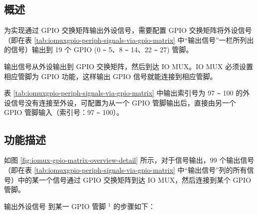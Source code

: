 \documentclass[main\_\_CN.tex]{subfiles}
\begin{document}
\subsection{概述}

为实现通过 GPIO 交换矩阵输出外设信号，需要配置 GPIO 交换矩阵将外设信号（即在表 \ref{tab:iomuxgpio-periph-signals-via-gpio-matrix} 中“输出信号”一栏所列出的信号）输出到 19 个 GPIO (0 \verb+~+ 5、8 \verb+~+ 14、22 \verb+~+ 27) 管脚。


输出信号从外设输出到 GPIO 交换矩阵，然后到达 IO MUX。IO MUX 必须设置相应管脚为 GPIO 功能，这样输出 GPIO 信号就能连接到相应管脚。

\begin{tiplisting}
表 \ref{tab:iomuxgpio-periph-signals-via-gpio-matrix} 中输出索引号为 97 \verb+~+ 100 的外设信号没有连接至外设，可配置为从一个 GPIO 管脚输出后，直接由另一个 GPIO 管脚输入（索引号：97 \verb+~+ 100）。
\end{tiplisting}
\vspace{-2em}


\subsection{功能描述}\label{IOMUXPeripheralOutput}

如图 \ref{fig:iomux-gpio-matrix-overview-detail} 所示，对于信号输出，99 个输出信号（即在表 \ref{tab:iomuxgpio-periph-signals-via-gpio-matrix} 中“输出信号”列的所有信号）中的某一个信号通过 GPIO 交换矩阵到达 IO MUX，然后连接到某个 GPIO 管脚。

输出外设信号  到某一 GPIO 管脚 \hyperref[output-note-1]{$^1$} 的步骤如下：
\end{document}
